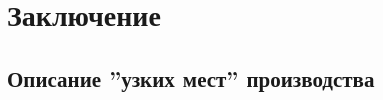 \newpage

\chapter{Заключение}

\section{Описание ''узких мест'' производства}



\begin{enumerate}




 
 
 
 






\end{enumerate}
